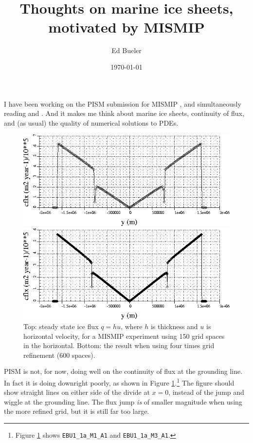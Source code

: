 \documentclass[11pt,final]{amsart}
\begin{document}
\title{Thoughts on marine ice sheets, motivated by MISMIP}
\author{Ed Bueler}
\date{\today}
\maketitle

I have been working on the PISM submission for MISMIP \cite{MISMIPwebpage}, and simultaneously reading \cite{SchoofMarine2} and \cite{SchoofMarine1}.  And it makes me think about marine ice sheets, continuity of flux, and (as usual) the quality of numerical solutions to PDEs.


\begin{figure}[ht]
\includegraphics[width=4.5in,keepaspectratio=true]{cflxEBU1_1a_M1_A1}

\includegraphics[width=4.5in,keepaspectratio=true]{cflxEBU1_1a_M3_A1}
\caption{Top: steady state ice flux $q=hu$, where $h$ is thickness and $u$ is horizontal velocity, for a MISMIP experiment using 150 grid spaces in the horizontal.  Bottom: the result when using four times grid refinement (600 spaces).}
\label{fig:badflux}
\end{figure}

PISM is not, for now, doing well on the continuity of flux at the grounding line.  In fact it is doing downright poorly, as shown in Figure \ref{fig:badflux}.\footnote{Figure \ref{fig:badflux} shows \texttt{EBU1\_1a\_M1\_A1} and \texttt{EBU1\_1a\_M3\_A1}.}  The figure should show straight lines on either side of the divide at $x=0$, instead of the jump and wiggle at the grounding line.  The flux jump \emph{is} of smaller magnitude when using the more refined grid, but it is still far too large.
\end{document}
